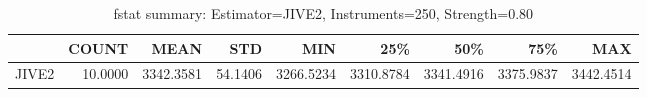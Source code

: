 \begin{table}[ht]
\centering
\caption{fstat summary: Estimator=JIVE2, Instruments=250, Strength=0.80}
\begin{tabular}{lrrrrrrrr}
\toprule
 & COUNT & MEAN & STD & MIN & 25\% & 50\% & 75\% & MAX \\
\midrule
JIVE2 & 10.0000 & 3342.3581 & 54.1406 & 3266.5234 & 3310.8784 & 3341.4916 & 3375.9837 & 3442.4514 \\
\bottomrule
\end{tabular}
\end{table}
